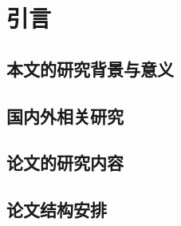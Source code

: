\chapter{引言}\label{chap:introduction}

\section{本文的研究背景与意义}

\section{国内外相关研究}

\section{论文的研究内容}

\section{论文结构安排}
